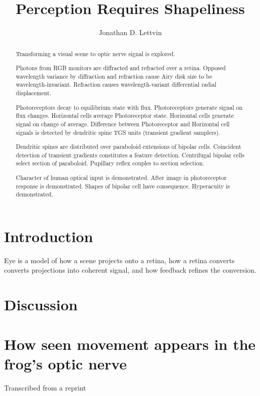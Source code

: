 \title{Perception Requires Shapeliness}
\author{Jonathan D. Lettvin}

\maketitle
\begin{abstract}

Transforming a visual scene to optic nerve signal is explored.

Photons from RGB monitors are diffracted and refracted over a retina.
Opposed wavelength variance by diffraction and refraction
cause Airy disk size to be wavelength-invariant.
Refraction causes wavelength-variant differential radial displacement.

Photoreceptors decay to equilibrium state with flux.
Photoreceptors generate signal on flux changes.
Horizontal cells average Photoreceptor state.
Horizontal cells generate signal on change of average.
Difference between Photoreceptor and Horizontal cell signals is
detected by dendritic spine TGS units (transient gradient samplers).

Dendritic spines are distributed over paraboloid extensions of bipolar cells.
Coincident detection of transient gradients constitutes a feature detection.
Centrifugal bipolar cells select section of paraboloid.
Pupillary reflex couples to section selection.

Character of human optical input is demonstrated.
After image in photoreceptor response is demonstrated.
Shapes of bipolar cell have consequence.
Hyperacuity is demonstrated.

\end{abstract}

\section{Introduction}
Eye is a model of how a scene projects onto a retina,
how a retina converts converts projections into coherent signal,
and how feedback refines the conversion.

\section{Discussion}


\appendix

\pagebreak
\section{How seen movement appears in the frog's optic nerve}\label{appendix:A}\cite{LettvinSeenMovement}
Transcribed from a reprint

